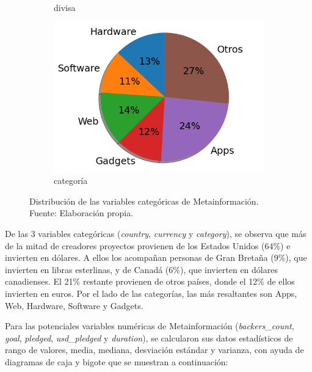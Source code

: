 \begin{figure}[!ht]
\begin{subfigure}{.36\textwidth}
		\caption{divisa}
	\end{subfigure}%
	\begin{subfigure}{.35\textwidth}
		\centering
		\includegraphics[width=1.15\linewidth]{4/figures/category_distribution.png}
		\caption{categoría}
	\end{subfigure}
	\caption[Distribución de las variables categóricas de Metainformación]{Distribución de las variables categóricas de Metainformación.\\
		Fuente: Elaboración propia.}
	\label{4:fig15}
\end{figure}

De las 3 variables categóricas (\textit{country}, \textit{currency} y \textit{category}), se observa que más de la mitad de creadores proyectos provienen de los Estados Unidos (64\%) e invierten en dólares. A ellos los acompañan personas de Gran Bretaña (9\%), que invierten en libras esterlinas, y de Canadá (6\%), que invierten en dólares canadienses. El 21\% restante provienen de otros países, donde el 12\% de ellos invierten en euros. Por el lado de las categorías, las más resaltantes son Apps, Web, Hardware, Software y Gadgets.

Para las potenciales variables numéricas de Metainformación (\textit{backers\_count}, \textit{goal}, \textit{pledged}, \textit{usd\_pledged} y \textit{duration}), se calcularon sus datos estadísticos de rango de valores, media, mediana, desviación estándar y varianza, con ayuda de diagramas de caja y bigote que se muestran a continuación:

